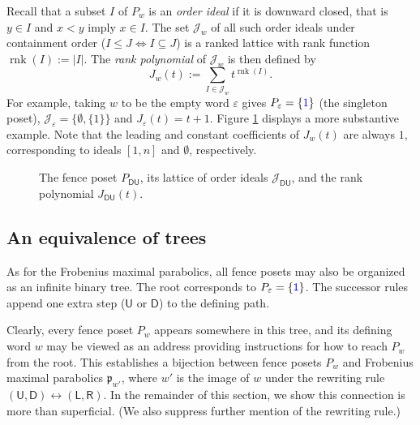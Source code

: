 \documentclass{amsart}
\newcommand{\demph}[1]{\textcolor{myblue}{\emph{#1}}}
\renewcommand{\demph}[1]{\emph{#1}}
\def\fp{\mathfrak p} %
\def\cJ{\mathcal J}
\newcommand{\Jfull}[1]{J_{#1}}
\def\rnk{\operatorname{rnk}}
\def\pL{\mathsf L}
\def\pR{\mathsf R}
\def\pU{\mathsf U}
\def\pD{\mathsf D}
\theoremstyle{definition}
\begin{document}
Recall that a subset $I$ of $P_w$ is an \demph{order ideal} if it is downward closed, that is $y\in I$ and $x<y$ imply $x\in I$. The set $\cJ_w$ of all such order ideals under containment order ($I \leq J \iff I \subseteq J$) is a ranked lattice    with rank function $\rnk(I):=|I|$. The \demph{rank polynomial} of $\cJ_w$ is then defined by
\[
	\Jfull{w}(t) := \sum_{I \in \cJ_w} t^{\rnk(I)}.
\]
For example,  taking $w$ to be the empty word $\varepsilon$ gives $P_\varepsilon=\{{\color{blue}1}\}$ (the singleton poset), $\cJ_\varepsilon=\{\emptyset,\{1\}\}$ and  $\Jfull{\varepsilon}(t) = t + 1$.  Figure \ref{fig:fence-poset-and-order-ideal} displays a more substantive example. 
Note that the leading and constant coefficients of $\Jfull{w}(t)$ are always $1$, corresponding to ideals $[1,n]$ and $\emptyset$, respectively. 
\begin{figure}[!hbt]
\centering

\caption{The fence poset $P_{\pD\pU}$, its lattice of order ideals $\cJ_{\pD\pU}$, and the rank polynomial $\Jfull{\pD\pU}(t)$.}
\label{fig:fence-poset-and-order-ideal}
\end{figure}

\subsection{An equivalence of trees}
\label{sec:tree-isomorphism}
As for the Frobenius maximal parabolics, all fence posets may also be organized as an infinite binary tree. The root corresponds to  $P_\varepsilon=\{\mathsf{\color{blue}1}\}$. The successor rules append one extra step ($\pU$ or $\pD$) to the defining path.
\begin{center}
\end{center}
Clearly, every fence poset $P_w$ appears somewhere in this tree, and its defining word $w$ may be viewed as an {address} providing instructions for how to reach $P_w$ from the root. This establishes a bijection between fence posets $P_w$ and Frobenius maximal parabolics $\fp_{w'}$, where $w'$ is the image of $w$ under the rewriting rule $(\pU,\pD) \leftrightarrow (\pL,\pR)$. In the remainder of this section, we show this connection is more than superficial. (We also suppress further mention of the rewriting rule.)
\end{document}
